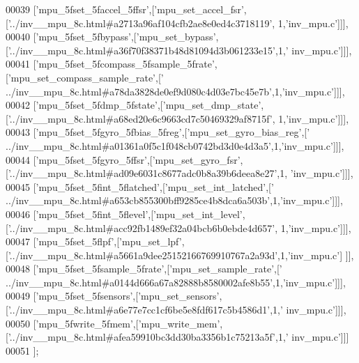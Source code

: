 \begin{DoxyCode}
00039   [\textcolor{stringliteral}{'mpu\_5fset\_5faccel\_5ffsr'},[\textcolor{stringliteral}{'mpu\_set\_accel\_fsr'},[\textcolor{stringliteral}{'../inv\_\_mpu\_8c.html#a2713a96af104cfb2ae8e0ed4c3718119'},
      1,\textcolor{stringliteral}{'inv\_mpu.c'}]]],
00040   [\textcolor{stringliteral}{'mpu\_5fset\_5fbypass'},[\textcolor{stringliteral}{'mpu\_set\_bypass'},[\textcolor{stringliteral}{'../inv\_\_mpu\_8c.html#a36f70f38371b48d81094d3b061233e15'},1,\textcolor{stringliteral}{'
      inv\_mpu.c'}]]],
00041   [\textcolor{stringliteral}{'mpu\_5fset\_5fcompass\_5fsample\_5frate'},[\textcolor{stringliteral}{'mpu\_set\_compass\_sample\_rate'},[\textcolor{stringliteral}{'
      ../inv\_\_mpu\_8c.html#a78da3828de0ef9d080c4d03e7bc45e7b'},1,\textcolor{stringliteral}{'inv\_mpu.c'}]]],
00042   [\textcolor{stringliteral}{'mpu\_5fset\_5fdmp\_5fstate'},[\textcolor{stringliteral}{'mpu\_set\_dmp\_state'},[\textcolor{stringliteral}{'../inv\_\_mpu\_8c.html#a68ed20e6c9663cd7c50469329af8715f'},
      1,\textcolor{stringliteral}{'inv\_mpu.c'}]]],
00043   [\textcolor{stringliteral}{'mpu\_5fset\_5fgyro\_5fbias\_5freg'},[\textcolor{stringliteral}{'mpu\_set\_gyro\_bias\_reg'},[\textcolor{stringliteral}{'
      ../inv\_\_mpu\_8c.html#a01361a0f5c1f048cb0742bd3d0e4d3a5'},1,\textcolor{stringliteral}{'inv\_mpu.c'}]]],
00044   [\textcolor{stringliteral}{'mpu\_5fset\_5fgyro\_5ffsr'},[\textcolor{stringliteral}{'mpu\_set\_gyro\_fsr'},[\textcolor{stringliteral}{'../inv\_\_mpu\_8c.html#ad09e6031c8677adc0b8a39b6deea8e27'},1,\textcolor{stringliteral}{
      'inv\_mpu.c'}]]],
00045   [\textcolor{stringliteral}{'mpu\_5fset\_5fint\_5flatched'},[\textcolor{stringliteral}{'mpu\_set\_int\_latched'},[\textcolor{stringliteral}{'
      ../inv\_\_mpu\_8c.html#a653cb855300bff9285ce4b8dca6a503b'},1,\textcolor{stringliteral}{'inv\_mpu.c'}]]],
00046   [\textcolor{stringliteral}{'mpu\_5fset\_5fint\_5flevel'},[\textcolor{stringliteral}{'mpu\_set\_int\_level'},[\textcolor{stringliteral}{'../inv\_\_mpu\_8c.html#acc92fb1489ef32a04bcb6b0ebde4d657'},
      1,\textcolor{stringliteral}{'inv\_mpu.c'}]]],
00047   [\textcolor{stringliteral}{'mpu\_5fset\_5flpf'},[\textcolor{stringliteral}{'mpu\_set\_lpf'},[\textcolor{stringliteral}{'../inv\_\_mpu\_8c.html#a5661a9dee25152166769910767a2a93d'},1,\textcolor{stringliteral}{'inv\_mpu.c'}]
      ]],
00048   [\textcolor{stringliteral}{'mpu\_5fset\_5fsample\_5frate'},[\textcolor{stringliteral}{'mpu\_set\_sample\_rate'},[\textcolor{stringliteral}{'
      ../inv\_\_mpu\_8c.html#a0144d666a67a82888b8580002afe8b55'},1,\textcolor{stringliteral}{'inv\_mpu.c'}]]],
00049   [\textcolor{stringliteral}{'mpu\_5fset\_5fsensors'},[\textcolor{stringliteral}{'mpu\_set\_sensors'},[\textcolor{stringliteral}{'../inv\_\_mpu\_8c.html#a6e77e7cc1cf6be5e8fdf617c5b4586d1'},1,\textcolor{stringliteral}{'
      inv\_mpu.c'}]]],
00050   [\textcolor{stringliteral}{'mpu\_5fwrite\_5fmem'},[\textcolor{stringliteral}{'mpu\_write\_mem'},[\textcolor{stringliteral}{'../inv\_\_mpu\_8c.html#afea59910bc3dd30ba3356b1c75213a5f'},1,\textcolor{stringliteral}{'
      inv\_mpu.c'}]]]
00051 ];
\end{DoxyCode}
